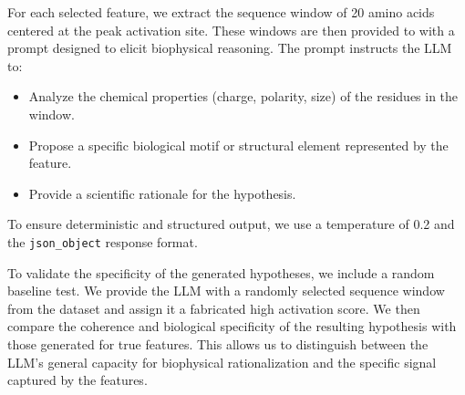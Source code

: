For each selected feature, we extract the sequence window of 20 amino acids centered at the peak activation site. These windows are then provided to \gpt with a prompt designed to elicit biophysical reasoning. The prompt instructs the LLM to:
\begin{itemize}[leftmargin=*,itemsep=0pt,topsep=0pt]
    \item Analyze the chemical properties (charge, polarity, size) of the residues in the window.
    \item Propose a specific biological motif or structural element represented by the feature.
    \item Provide a scientific rationale for the hypothesis.
\end{itemize}
To ensure deterministic and structured output, we use a temperature of 0.2 and the \texttt{json\_object} response format.

To validate the specificity of the generated hypotheses, we include a random baseline test. We provide the LLM with a randomly selected sequence window from the dataset and assign it a fabricated high activation score. We then compare the coherence and biological specificity of the resulting hypothesis with those generated for true \sae features. This allows us to distinguish between the LLM's general capacity for biophysical rationalization and the specific signal captured by the \sae features.
